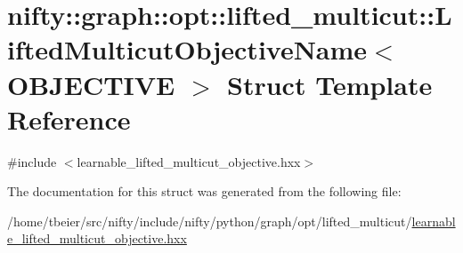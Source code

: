 \hypertarget{structnifty_1_1graph_1_1opt_1_1lifted__multicut_1_1LiftedMulticutObjectiveName}{}\section{nifty\+:\+:graph\+:\+:opt\+:\+:lifted\+\_\+multicut\+:\+:Lifted\+Multicut\+Objective\+Name$<$ O\+B\+J\+E\+C\+T\+I\+VE $>$ Struct Template Reference}
\label{structnifty_1_1graph_1_1opt_1_1lifted__multicut_1_1LiftedMulticutObjectiveName}


{\ttfamily \#include $<$learnable\+\_\+lifted\+\_\+multicut\+\_\+objective.\+hxx$>$}



The documentation for this struct was generated from the following file\+:\begin{DoxyCompactItemize}
\item 
/home/tbeier/src/nifty/include/nifty/python/graph/opt/lifted\+\_\+multicut/\hyperlink{learnable__lifted__multicut__objective_8hxx}{learnable\+\_\+lifted\+\_\+multicut\+\_\+objective.\+hxx}\end{DoxyCompactItemize}
